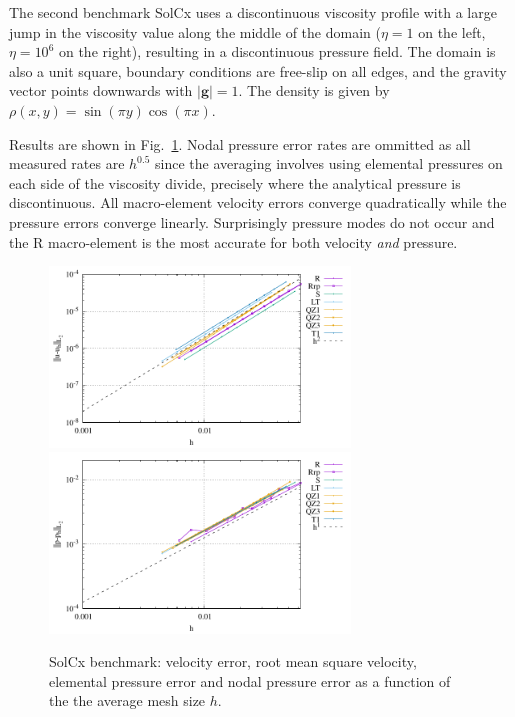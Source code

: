 \documentclass[a4paper,12pt]{article}
\begin{document}
The second benchmark SolCx uses a discontinuous viscosity profile with a large jump in
the viscosity value along the middle of the domain ($\eta=1$ on the left,
$\eta=10^6$ on the right), resulting in a discontinuous pressure field. 
The domain is also a unit square, boundary conditions are free-slip on all edges, and
the gravity vector points downwards with $|{\bm g}| = 1$. 
The density is given by $\rho(x,y) = \sin(\pi y) \cos(\pi x)$.

Results are shown in Fig.~\ref{fig:ressolcx}.
Nodal pressure error rates are ommitted as all 
measured rates are $h^{0.5}$ since the averaging 
involves using elemental pressures on each side of the viscosity divide,
precisely where the analytical pressure is discontinuous.
All macro-element velocity errors converge quadratically 
while the pressure errors converge linearly.
Surprisingly pressure modes do not occur and the R macro-element
is the most accurate for both velocity {\it and} pressure.

\begin{figure}
\centering
\includegraphics[width=8cm]{../results/errors_u_exp13}
\includegraphics[width=8cm]{../results/errors_p_exp13}
\caption{SolCx benchmark: velocity error, 
root mean square velocity, elemental pressure error and nodal pressure error
as a function of the the average mesh size $h$.} 
\label{fig:ressolcx}
\end{figure}
\end{document}
